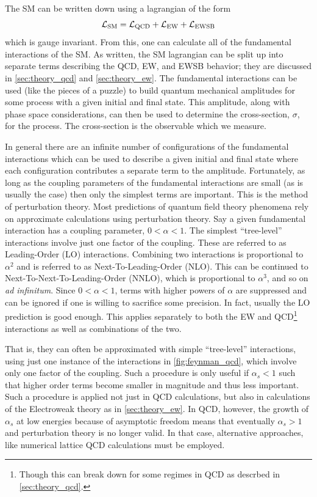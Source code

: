 The SM can be written down using a lagrangian of the form
\begin{equation}
\mathcal{L}_{\textrm{SM}} = \mathcal{L}_{\textrm{QCD}} + \mathcal{L}_{\textrm{EW}} + \mathcal{L}_{\textrm{EWSB}}
\label{eq:lagrangian_sm}
\end{equation}
which is gauge invariant.
From this, one can calculate all of the fundamental interactions of the SM.
As written, the SM lagrangian can be split up into separate terms describing the
QCD, EW, and EWSB behavior; they are discussed in \sec\ref{sec:theory_qcd} and
\sec\ref{sec:theory_ew}.
The fundamental interactions can be used (like the pieces of a puzzle)
to build quantum mechanical amplitudes for some process 
with a given initial and final state. 
This amplitude, along with phase space considerations, can then be used
to determine the cross-section, $\sigma$, for the process. The cross-section
is the observable which we measure.


In general there are an infinite number of configurations of the fundamental
interactions which can be used to describe a given initial and final state where
each configuration contributes a separate term to the amplitude. 
Fortunately,
as long as the coupling parameters of the fundamental interactions are small
(as is usually the case) then only the simplest terms are important.
This is the method of perturbation theory.  
Most predictions of quantum field theory phenomena rely on approximate calculations
using perturbation theory. Say a given fundamental interaction has a coupling 
parameter, $0 < \alpha < 1$. The simplest ``tree-level'' interactions
involve just one factor of the coupling. 
These are referred to as 
Leading-Order (LO) interactions.
Combining two interactions 
is proportional to $\alpha^2$ and is referred to as Next-To-Leading-Order (NLO).
This can be continued to Next-To-Next-To-Leading-Order (NNLO), which is 
proportional to $\alpha^3$, and so on \emph{ad infinitum}.
Since $0 < \alpha < 1$, terms with higher powers of $\alpha$ are suppressed
and can be ignored if one is willing to sacrifice some precision. In fact,
usually the LO prediction is good enough. This applies separately to 
both the EW and QCD\footnote{Though this can break down for some
regimes in QCD as descrbed in \sec\ref{sec:theory_qcd}.}
interactions as well as combinations of the two. 



That is, they can often be approximated with simple ``tree-level'' interactions,
using just one instance of the interactions in \fig\ref{fig:feynman_qcd},
which involve only one factor of the coupling.  
Such a procedure is only useful if $\alpha_s < 1$ such that higher order
terms become smaller in magnitude and thus less important. Such a procedure
is applied not just in QCD calculations, but also in calculations
of the Electroweak theory as in \sec\ref{sec:theory_ew}.
In QCD, however, the growth of $\alpha_s$ at low energies because of asymptotic
freedom means that eventually $\alpha_s > 1$ and perturbation theory is no longer
valid. In that case, alternative approaches, like numerical lattice QCD
calculations must be employed.


